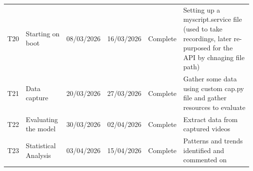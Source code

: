 \begin{landscape}
\begin{longtable}{@{}p{1.5cm} p{6.5cm} ccc p{9cm}@{}}
    T20 & Starting on boot & 08/03/2026 & 16/03/2026 & Complete & Setting up a myscript.service file (used to take recordings, later re-purposed for the API by chnaging file path) \\
    T21 & Data capture & 20/03/2026 & 27/03/2026 & Complete & Gather some data using custom cap.py file and gather resources to evaluate \\
    T22 & Evaluating the model & 30/03/2026 & 02/04/2026 & Complete & Extract data from captured videos \\
    T23 & Statistical Analysis & 03/04/2026 & 15/04/2026 & Complete & Patterns and trends identified and commented on \\
\end{longtable}

\end{landscape}
\clearpage